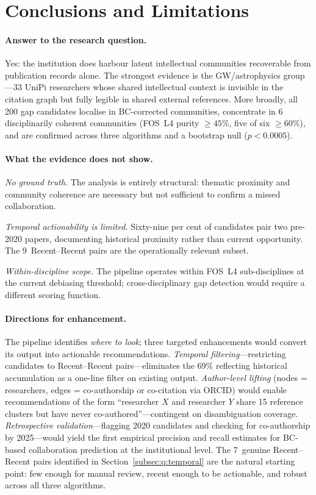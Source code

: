 \section{Conclusions and Limitations}
\label{subsec:q:scope}

\paragraph{Answer to the research question.}
Yes: the institution does harbour latent intellectual communities
recoverable from publication records alone.  The strongest evidence
is the GW/astrophysics group---33 UniPi researchers whose shared
intellectual context is invisible in the citation graph but fully
legible in shared external references.  More broadly, all 200 gap
candidates localise in BC-corrected communities, concentrate in 6
disciplinarily coherent communities (FOS~L4 purity $\geq 45\%$,
five of six $\geq 60\%$), and are confirmed across three algorithms
and a bootstrap null ($p < 0.0005$).

\paragraph{What the evidence does not show.}

\textit{No ground truth.}  The analysis is entirely structural:
thematic proximity and community coherence are necessary but not
sufficient to confirm a missed collaboration.

\textit{Temporal actionability is limited.}  Sixty-nine per cent of
candidates pair two pre-2020 papers, documenting historical proximity
rather than current opportunity.  The 9~Recent--Recent pairs are the
operationally relevant subset.

\textit{Within-discipline scope.}  The pipeline operates within
FOS~L4 sub-disciplines at the current debiasing threshold;
cross-disciplinary gap detection would require a different scoring
function.

\paragraph{Directions for enhancement.}
The pipeline identifies \emph{where to look}; three targeted
enhancements would convert its output into actionable
recommendations.  \textit{Temporal filtering}---restricting
candidates to Recent--Recent pairs---eliminates the 69\% reflecting
historical accumulation as a one-line filter on existing output.
\textit{Author-level lifting} (nodes = researchers, edges =
co-authorship or co-citation via ORCID) would enable recommendations
of the form ``researcher $X$ and researcher $Y$ share 15 reference
clusters but have never co-authored''---contingent on disambiguation
coverage.  \textit{Retrospective validation}---flagging 2020
candidates and checking for co-authorship by 2025---would yield the
first empirical precision and recall estimates for BC-based
collaboration prediction at the institutional level.  The
7~genuine Recent--Recent pairs identified in
Section~\ref{subsec:q:temporal} are the natural starting point: few
enough for manual review, recent enough to be actionable, and robust
across all three algorithms.

